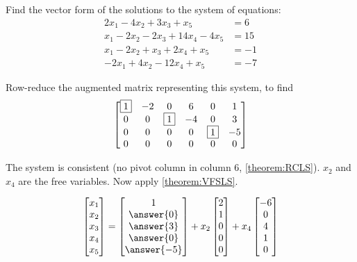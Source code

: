 \documentclass{ximera}
\author{Robert Beezer}
\begin{document}
\begin{exercise}
  Find the vector form of the solutions to the system of equations:
  \begin{align*}
    2x_1-4x_2+3x_3+x_5&=6\\
    x_1-2x_2-2x_3+14x_4-4x_5&=15\\
    x_1-2x_2+x_3+2x_4+x_5&=-1\\
    -2x_1+4x_2-12x_4+x_5&=-7
  \end{align*}

  \begin{hint}
    Row-reduce the augmented matrix representing this system, to find
    \[
      \begin{bmatrix}
        \fbox{1} & -2 & 0 & 6 & 0 & 1\\
        0 & 0 & \fbox{1} & -4 & 0 & 3\\
        0 & 0 & 0 & 0 & \fbox{1} & -5\\
        0 & 0 & 0 & 0 & 0 & 0
      \end{bmatrix}
    \]
  \end{hint}

  \begin{hint}
    The system is consistent (no pivot column in column 6,
    \ref{theorem:RCLS}). $x_2$ and $x_4$ are the free variables.  Now
    apply \ref{theorem:VFSLS}.
  \end{hint}

  \[
    \colvector{x_1\\x_2\\x_3\\x_4\\x_5}
    =
    \colvector{1\\\answer{0}\\\answer{3}\\\answer{0}\\\answer{-5}}+
    x_2\colvector{2\\1\\0\\0\\0}+
    x_4\colvector{-6\\0\\4\\1\\0}
  \]

\end{exercise}
\end{document}
